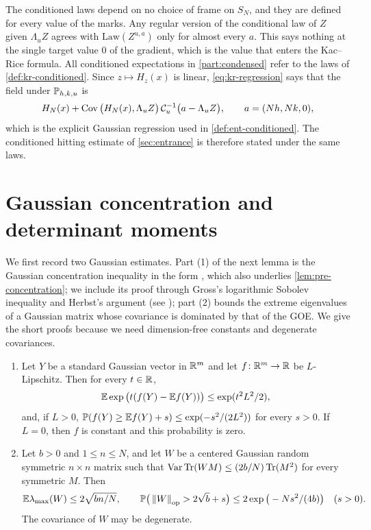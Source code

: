 The conditioned laws depend on no choice of frame on $S_N$, and they are defined for every value of the marks. Any regular version of the conditional law of $Z$ given $\Lambda_uZ$ agrees with $\mathrm{Law}(Z^{u,a})$ only for almost every $a$. This says nothing at the single target value $0$ of the gradient, which is the value that enters the Kac--Rice formula. All conditioned expectations in \cref{part:condensed} refer to the laws of \cref{def:kr-conditioned}. Since $z\mapsto H_z(x)$ is linear, \eqref{eq:kr-regression} says that the field under $\mathbb P_{h,k,u}$ is
\[
H_N(x)+\operatorname{Cov}\big(H_N(x),\Lambda_uZ\big)\,\mathcal C_u^{-1}\big(a-\Lambda_uZ\big),\qquad a=(Nh,Nk,0),
\]
which is the explicit Gaussian regression used in \cref{def:ent-conditioned}. The conditioned hitting estimate of \cref{sec:entrance} is therefore stated under the same laws.

\section{Gaussian concentration and determinant moments}\label{sec:kr-determinants}

We first record two Gaussian estimates. Part (1) of the next lemma is the Gaussian concentration inequality in the form \cite[Proposition~4.1 and (4.1)]{LedouxSemigroup1994}, which also underlies \cref{lem:pre-concentration}; we include its proof through Gross's logarithmic Sobolev inequality \cite{Gross1975} and Herbst's argument (see \cite{Ledoux2001,BakryGentilLedoux2014}); part (2) bounds the extreme eigenvalues of a Gaussian matrix whose covariance is dominated by that of the GOE. We give the short proofs because we need dimension-free constants and degenerate covariances.

\begin{lemma}\label{lem:kr-gaussian}
\begin{enumerate}
\item Let $Y$ be a standard Gaussian vector in $\mathbb R^m$ and let $f\colon\mathbb R^m\to\mathbb R$ be $L$-Lipschitz. Then for every $t\in\mathbb R$,
\begin{equation}\label{eq:kr-mgf}
\mathbb E\exp\big(t(f(Y)-\mathbb E f(Y))\big)\le\exp(t^2L^2/2),
\end{equation}
and, if $L>0$, $\mathbb P(f(Y)\ge\mathbb E f(Y)+s)\le\exp(-s^2/(2L^2))$ for every $s>0$. If $L=0$, then $f$ is constant and this probability is zero.
\item Let $b>0$ and $1\le n\le N$, and let $W$ be a centered Gaussian random symmetric $n\times n$ matrix such that $\operatorname{Var}\operatorname{Tr}(WM)\le(2b/N)\operatorname{Tr}(M^2)$ for every symmetric $M$. Then
\begin{equation}\label{eq:kr-edge}
\mathbb E\lambda_{\max}(W)\le2\sqrt{bn/N},\qquad \mathbb P\big(\left\lVert W\right\rVert_{\rm op}>2\sqrt b+s\big)\le2\exp\big(-Ns^2/(4b)\big)\quad(s>0).
\end{equation}
The covariance of $W$ may be degenerate.
\end{enumerate}
\end{lemma}


